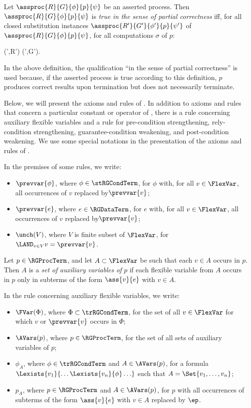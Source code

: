 \documentclass[runningheads]{llncs}
\begin{document}
Let $\assproc{R}{G}{\phi}{p}{\psi}$ be an asserted process.
Then $\assproc{R}{G}{\phi}{p}{\psi}$ is 
\emph{true in the sense of partial correctness} iff, 
for all closed substitution instances 
$\assproc{R'}{G'}{\phi'}{p}{\psi'}$ of $\assproc{R}{G}{\phi}{p}{\psi}$,
for all computations $\sigma$ of $p$:
\begin{ldispl}
\sigma \asat (\phi',R') \quad{}\quad
\sigma \csat (\psi',G')\;.
\end{ldispl}%

In the above definition, the qualification ``in the sense of partial 
correctness'' is used because, if the asserted process is true according 
to this definition, $p$ produces correct results upon termination but 
does not necessarily terminate.

Below, we will present the axioms and rules of \RG.
In addition to axioms and rules that concern a particular constant or 
operator of \deACPei, there is a rule concerning auxiliary 
flexible variables and a rule for pre-condition strengthening, 
rely-condition strengthening, guarantee-condition weakening, and
post-condition weakening.
We use some special notations in the presentation of the axioms and 
rules of \RG.

In the premises of some rules, we write:
\begin{itemize}
\item
$\prevvar{\phi}$, where $\phi \in \stRGCondTerm$, for $\phi$ with, for 
all $v \in \FlexVar$, all occurrences of $v$ replaced by\nolinebreak[2]
$\prevvar{v}$;
\item
$\prevvar{e}$, where $e \in \RGDataTerm$, for $e$ with, for all 
$v \in \FlexVar$, all occurrences of $v$ replaced by\nolinebreak[2]
$\prevvar{v}$;
\item
$\unch(V)$, where $V$ is finite subset of $\FlexVar$, for 
$\LAND_{v \in V} v = \prevvar{v}$.
\end{itemize}

Let $p \in \RGProcTerm$, and let $A \subset \FlexVar$ be such that each 
$v \in A$ occurs in $p$.
Then $A$ is a \emph{set of auxiliary variables of} $p$ if each  
flexible variable from $A$ occurs in $p$ only in subterms of the form 
$\ass{v}{e}$ with $v \in A$.

In the rule concerning auxiliary flexible variables, we write:
\begin{itemize}
\item
$\FVar(\Phi)$, where $\Phi \subset \trRGCondTerm$, for the set of all 
$v \in \FlexVar$ for which $v$ or $\prevvar{v}$ occurs in $\Phi$;
\item
$\AVars(p)$, where $p \in \RGProcTerm$, for the set of all sets of 
auxiliary variables of $p$;
\item
$\phi_A$, where $\phi \in \trRGCondTerm$ and $A \in \AVars(p)$, for a
formula $\Lexists{v_1}{\ldots\Lexists{v_n}{\phi}\ldots}$ such that 
$A = \Set{v_1,\ldots,v_n}$;
\item
$p_A$, where $p \in \RGProcTerm$ and $A \in \AVars(p)$, for $p$ with all 
occurrences of subterms of the form $\ass{v}{e}$ with $v \in A$ replaced 
by $\ep$.
\end{itemize}
\end{document}
